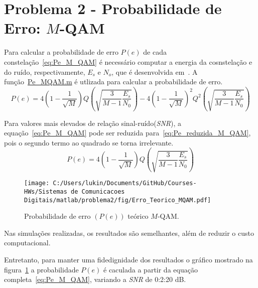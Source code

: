 \section{Problema 2 - Probabilidade de Erro: \texorpdfstring{$M$}{M}-QAM}
Para calcular a probabilidade de erro $P(e)$ de cada constelação~\ref{eq:Pe_M_QAM} é necessário computar a energia da cosnstelação e do ruído, respectivamente, $E_s$ e $N_o$, que é desenvolvida em~\cite{Cecilio}. A função~\href{https://raw.githubusercontent.com/lucasabdalah/Courses-HWs/SCD/Sistemas%20de%20Comunicacoes%20Digitais/matlab/problema2/Pe_MQAM.m}{Pe\_MQAM.m} é utlizada para calcular a probabilidade de erro.
\begin{equation}
    P(e) = 4 \left(1-\frac{1}{\sqrt{M}}\right) Q\left(\sqrt{\frac{3}{M-1}\frac{E_s}{N_0}}\right) - 4\left(1-\frac{1}{\sqrt{M}}\right)^2 Q^2\left(\sqrt{\frac{3}{M-1}\frac{E_s}{N_0}}\right)
    \label{eq:Pe_M_QAM}
\end{equation}

Para valores mais elevados de relação sinal-ruído(\textit{SNR}), a equação~\ref{eq:Pe_M_QAM} pode ser reduzida para~\ref{eq:Pe_reduzida_M_QAM}, pois o segundo termo ao quadrado se torna irrelevante.
\begin{equation}
    P(e) = 4 \left(1-\frac{1}{\sqrt{M}}\right) Q\left(\sqrt{\frac{3}{M-1}\frac{E_s}{N_0}}\right)
    \label{eq:Pe_reduzida_M_QAM}
\end{equation}

\begin{figure}[!ht]
    \centering
    \texttt{[image: C:/Users/lukin/Documents/GitHub/Courses-HWs/Sistemas de Comunicacoes Digitais/matlab/problema2/fig/Erro\_Teorico\_MQAM.pdf]}
    \caption{Probabilidade de erro $(P(e))$ teórico $M$-QAM.}
    \label{fig:Erro_Teorico_MQAM}
\end{figure}

Nas simulações realizadas, os resultados são semelhantes, além de reduzir o custo computacional.

Entretanto, para manter uma fidedignidade dos resultados o gráfico mostrado na figura~\ref{fig:Erro_Teorico_MQAM} a probabilidade $P(e)$ é caculada a partir da equação completa~\ref{eq:Pe_M_QAM}, variando a \textit{SNR} de 0:2:20 dB.